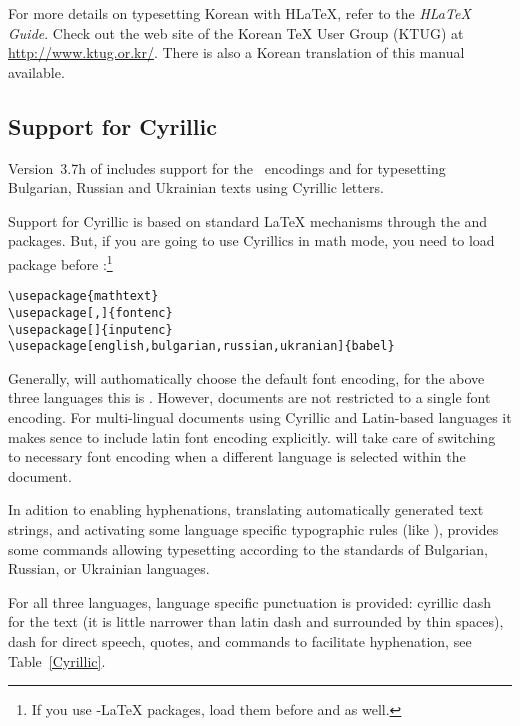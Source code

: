 For more details on typesetting  Korean with H\LaTeX{}, refer to
the \emph{H\LaTeX{} Guide}.  Check out the web site of the Korean
\TeX{} User Group (KTUG) at  \url{http://www.ktug.or.kr/}.
There is also a Korean translation
of this manual available.


\subsection{Support for Cyrillic}

Version~3.7h of  includes support for the
~encodings and for typesetting Bulgarian, Russian and
Ukrainian texts using Cyrillic letters.  

Support for Cyrillic is based on standard \LaTeX{} mechanisms through 
the  and  packages. But, if you are going to
use Cyrillics in math mode, you need to load  package
before :\footnote{If you use \AmS-\LaTeX{} packages, 
load them before  and  as well.}
\begin{lscommand}
\verb+\usepackage{mathtext}+\\
\verb+\usepackage[+\verb+,+\verb+]{fontenc}+\\
\verb+\usepackage[+\verb+]{inputenc}+\\
\verb+\usepackage[english,bulgarian,russian,ukranian]{babel}+
\end{lscommand}

Generally,  will authomatically choose the default font encoding,
for the above three languages this is .  
However, documents are not restricted to a single font encoding.
For multi-lingual documents using Cyrillic and Latin-based languages
it makes sence to include latin font encoding explicitly.  
will take care of switching to necessary font encoding when a different language 
is selected within the document.

In adition to enabling hyphenations, translating automatically
generated text strings, and activating some language specific 
typographic rules (like ),  provides some 
commands allowing typesetting according to the standards of 
Bulgarian, Russian, or Ukrainian languages. 


For all three languages, language specific punctuation is provided:
cyrillic dash for the text (it is little narrower than latin dash and
surrounded by thin spaces), dash for direct speech, quotes, and
commands to facilitate hyphenation, see Table~\ref{Cyrillic}.

